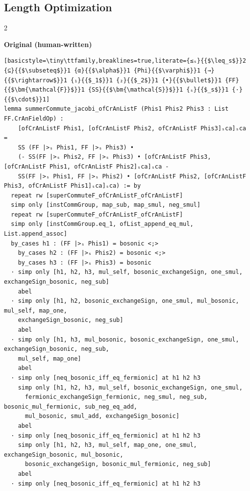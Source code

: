 \subsection{Length Optimization}
{
    \setlength{\columnsep}{0.2cm}
    
    \begin{paracol}{2}

{
\textbf{Original (human-written)}
\begin{lstlisting}[basicstyle=\tiny\ttfamily,breaklines=true,literate={≤ₛ}{{$\leq_s$}}2 {⊆}{{$\subseteq$}}1 {α}{{$\alpha$}}1 {Phi}{{$\varphi$}}1 {→}{{$\rightarrow$}}1 {₁}{{$_1$}}1 {₂}{{$_2$}}1 {•}{{$\bullet$}}1 {FF}{{$\bm{\mathcal{F}}$}}1 {SS}{{$\bm{\mathcal{S}}$}}1 {ₛ}{{$_s$}}1 {·}{{$\cdot$}}1]
lemma summerCommute_jacobi_ofCrAnListF (Phis1 Phis2 Phis3 : List FF.CrAnFieldOp) :
    [ofCrAnListF Phis1, [ofCrAnListF Phis2, ofCrAnListF Phis3]ₛca]ₛca =
    SS (FF |>ₛ Phis1, FF |>ₛ Phis3) •
    (- SS(FF |>ₛ Phis2, FF |>ₛ Phis3) • [ofCrAnListF Phis3, [ofCrAnListF Phis1, ofCrAnListF Phis2]ₛca]ₛca -
    SS(FF |>ₛ Phis1, FF |>ₛ Phis2) • [ofCrAnListF Phis2, [ofCrAnListF Phis3, ofCrAnListF Phis1]ₛca]ₛca) := by
  repeat rw [superCommuteF_ofCrAnListF_ofCrAnListF]
  simp only [instCommGroup, map_sub, map_smul, neg_smul]
  repeat rw [superCommuteF_ofCrAnListF_ofCrAnListF]
  simp only [instCommGroup.eq_1, ofList_append_eq_mul, List.append_assoc]
  by_cases h1 : (FF |>ₛ Phis1) = bosonic <;>
    by_cases h2 : (FF |>ₛ Phis2) = bosonic <;>
    by_cases h3 : (FF |>ₛ Phis3) = bosonic
  · simp only [h1, h2, h3, mul_self, bosonic_exchangeSign, one_smul, exchangeSign_bosonic, neg_sub]
    abel
  · simp only [h1, h2, bosonic_exchangeSign, one_smul, mul_bosonic, mul_self, map_one,
    exchangeSign_bosonic, neg_sub]
    abel
  · simp only [h1, h3, mul_bosonic, bosonic_exchangeSign, one_smul, exchangeSign_bosonic, neg_sub,
    mul_self, map_one]
    abel
  · simp only [neq_bosonic_iff_eq_fermionic] at h1 h2 h3
    simp only [h1, h2, h3, mul_self, bosonic_exchangeSign, one_smul,
      fermionic_exchangeSign_fermionic, neg_smul, neg_sub, bosonic_mul_fermionic, sub_neg_eq_add,
      mul_bosonic, smul_add, exchangeSign_bosonic]
    abel
  · simp only [neq_bosonic_iff_eq_fermionic] at h1 h2 h3
    simp only [h1, h2, h3, mul_self, map_one, one_smul, exchangeSign_bosonic, mul_bosonic,
      bosonic_exchangeSign, bosonic_mul_fermionic, neg_sub]
    abel
  · simp only [neq_bosonic_iff_eq_fermionic] at h1 h2 h3

\end{lstlisting}}
\end{paracol}}
